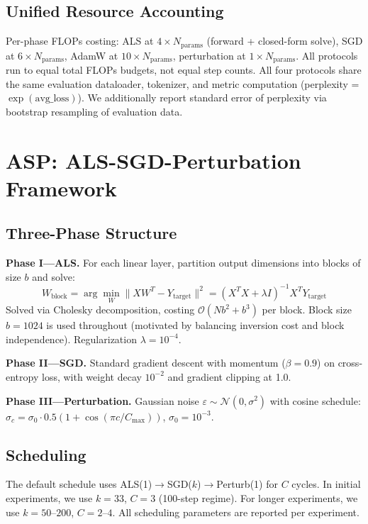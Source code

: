 \documentclass[11pt]{article}
\begin{document}
\subsection{Unified Resource Accounting}

Per-phase FLOPs costing: ALS at $4 \times N_{\text{params}}$ (forward + closed-form solve), SGD at $6 \times N_{\text{params}}$, AdamW at $10 \times N_{\text{params}}$, perturbation at $1 \times N_{\text{params}}$. All protocols run to equal total FLOPs budgets, not equal step counts. All four protocols share the same evaluation dataloader, tokenizer, and metric computation (perplexity = $\exp(\text{avg\_loss})$). We additionally report standard error of perplexity via bootstrap resampling of evaluation data.

\section{ASP: ALS-SGD-Perturbation Framework}

\subsection{Three-Phase Structure}

\textbf{Phase I---ALS.} For each linear layer, partition output dimensions into blocks of size $b$ and solve:
\begin{equation}
W_{\text{block}} = \arg\min_W \|X W^T - Y_{\text{target}}\|^2 = (X^T X + \lambda I)^{-1} X^T Y_{\text{target}}
\end{equation}
Solved via Cholesky decomposition, costing $\mathcal{O}(Nb^2 + b^3)$ per block. Block size $b=1024$ is used throughout (motivated by balancing inversion cost and block independence). Regularization $\lambda = 10^{-4}$.

\textbf{Phase II---SGD.} Standard gradient descent with momentum ($\beta=0.9$) on cross-entropy loss, with weight decay $10^{-2}$ and gradient clipping at 1.0.

\textbf{Phase III---Perturbation.} Gaussian noise $\varepsilon \sim \mathcal{N}(0, \sigma^2)$ with cosine schedule: $\sigma_c = \sigma_0 \cdot 0.5(1 + \cos(\pi c / C_{\max}))$, $\sigma_0 = 10^{-3}$.

\subsection{Scheduling}

The default schedule uses ALS(1)$\rightarrow$SGD($k$)$\rightarrow$Perturb(1) for $C$ cycles. In initial experiments, we use $k=33$, $C=3$ (100-step regime). For longer experiments, we use $k=50$--$200$, $C=2$--$4$. All scheduling parameters are reported per experiment.
\end{document}
